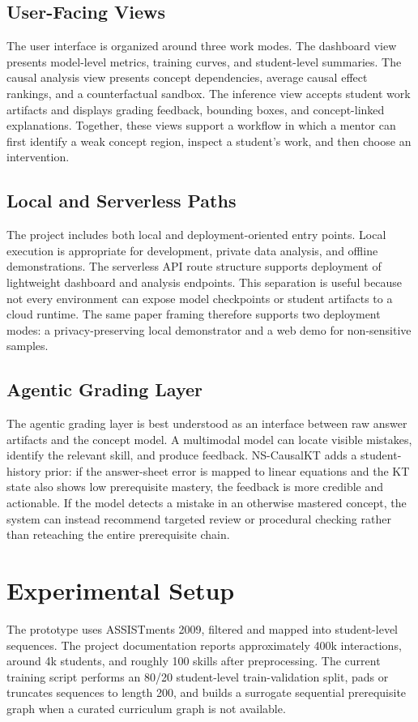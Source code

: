 \documentclass[conference]{IEEEtran}
\begin{document}
\subsection{User-Facing Views}
The user interface is organized around three work modes. The dashboard view presents model-level metrics, training curves, and student-level summaries. The causal analysis view presents concept dependencies, average causal effect rankings, and a counterfactual sandbox. The inference view accepts student work artifacts and displays grading feedback, bounding boxes, and concept-linked explanations. Together, these views support a workflow in which a mentor can first identify a weak concept region, inspect a student's work, and then choose an intervention.

\subsection{Local and Serverless Paths}
The project includes both local and deployment-oriented entry points. Local execution is appropriate for development, private data analysis, and offline demonstrations. The serverless API route structure supports deployment of lightweight dashboard and analysis endpoints. This separation is useful because not every environment can expose model checkpoints or student artifacts to a cloud runtime. The same paper framing therefore supports two deployment modes: a privacy-preserving local demonstrator and a web demo for non-sensitive samples.

\subsection{Agentic Grading Layer}
The agentic grading layer is best understood as an interface between raw answer artifacts and the concept model. A multimodal model can locate visible mistakes, identify the relevant skill, and produce feedback. NS-CausalKT adds a student-history prior: if the answer-sheet error is mapped to linear equations and the KT state also shows low prerequisite mastery, the feedback is more credible and actionable. If the model detects a mistake in an otherwise mastered concept, the system can instead recommend targeted review or procedural checking rather than reteaching the entire prerequisite chain.

\section{Experimental Setup}
The prototype uses ASSISTments 2009, filtered and mapped into student-level sequences. The project documentation reports approximately 400k interactions, around 4k students, and roughly 100 skills after preprocessing. The current training script performs an 80/20 student-level train-validation split, pads or truncates sequences to length 200, and builds a surrogate sequential prerequisite graph when a curated curriculum graph is not available.
\end{document}
